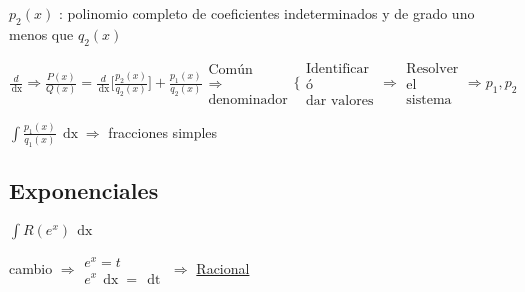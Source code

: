 \documentclass[8pt]{article}
\DeclareMathOperator{\xder}{\, \mathrm{d}x}
\DeclareMathOperator{\tder}{\, \mathrm{d}t}
\begin{document}
			$ p_2 (x) $ : polinomio completo de coeficientes indeterminados y de grado uno menos que $ q_2 (x) $

			$ \frac{d}{\xder} \Rightarrow \frac{P(x)}{Q(x)} = \frac{d}{\xder} 
				\Big[ \frac{p_2 (x)}{q_2 (x)} \Big] + \frac{p_1 (x)}{q_2 (x)}
				\begin{array}{c}
					\text{Común}\\
					\Rightarrow\\
					\text{denominador}
				\end{array}
				\Bigg \{
				\begin{array}{c}
					\text{Identificar}\\
					\text{ó}\\
					\text{dar valores}
				\end{array}
				\Rightarrow
				\begin{array}{c}
					\text{Resolver}\\
					\text{el}\\
					\text{sistema}
				\end{array} \Rightarrow p_1 , p_2 $

				$ \int \frac{p_1 (x)}{q_1 (x)} \xder \Rightarrow $ fracciones simples

	\subsection{Exponenciales}
		$ \int R (e^x) \xder $

			cambio $ \Rightarrow
			\begin{array}{c}
				e^x = t\\
				e^x \xder = \tder
			\end{array}
			\Rightarrow $ \underline{Racional}
\end{document}
